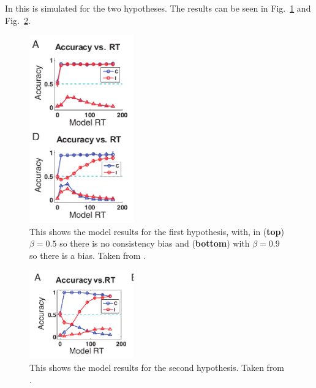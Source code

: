\documentclass[12pt]{article}
\begin{document}
In \cite{YuDayanCohen2009} this is simulated for the two hypotheses. The results can be seen in Fig.~\ref{fig_h1} and Fig.~\ref{fig_h2}.
 



\begin{figure}[tb]
\begin{center}
  \includegraphics[width=4.5cm]{flanker_model1.png}
\end{center}
\caption{This shows the model results for the first hypothesis, with, in (\textbf{top}) $\beta=0.5$ so there is no consistency bias and (\textbf{bottom}) with $\beta=0.9$ so there is a bias. Taken from \cite{YuDayanCohen2009}. \label{fig_h1}}
\end{figure}


\begin{figure}[tb]
\begin{center}
  \includegraphics[width=4.5cm]{flanker_model2.png}
\end{center}
\caption{This shows the model results for the second hypothesis. Taken from \cite{YuDayanCohen2009}. \label{fig_h2}}
\end{figure}





{}
\end{document}
